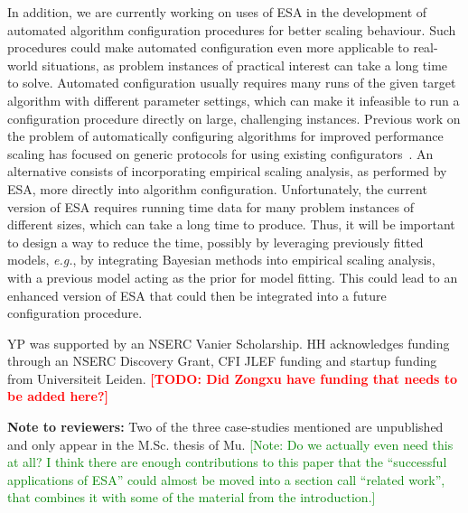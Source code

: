 \documentclass[aic]{iosart2x}
\newcommand{\eg}{\emph{e.g.}}
\newcommand{\todo}[1]{\textcolor{red}{\bf [TODO: #1]}}
\newcommand{\note}[1]{\textcolor{green}{[Note: #1]}}
\begin{document}
In addition, we are currently working on uses of ESA in the development of automated algorithm configuration procedures for better scaling behaviour. Such procedures could make automated configuration even more applicable to real-world situations, as problem instances of practical interest can take a long time to solve. Automated configuration usually requires many runs of the given target algorithm with different parameter settings, which can make it infeasible to run a configuration procedure directly on large, challenging instances.
Previous work on the problem of automatically configuring algorithms for improved performance scaling has focused on generic protocols for using existing configurators~\cite{StyEtAl12,StyHoo13}. 
An alternative consists of incorporating empirical scaling analysis, as performed by ESA, more directly into algorithm configuration. Unfortunately, the current version of ESA requires running time data for many problem instances of different sizes,
which can take a long time to produce. Thus, it will be important to design a way to reduce the time, possibly by leveraging previously fitted models, \eg{}, by integrating Bayesian methods into empirical scaling analysis, with a previous model acting as the prior for model fitting. This could lead to an enhanced version of ESA that could then be integrated into a future configuration procedure.


\begin{acks}
YP was supported by an NSERC Vanier Scholarship. HH acknowledges funding through an NSERC Discovery Grant, CFI JLEF funding and startup funding from Universiteit Leiden. \todo{Did Zongxu have funding that needs to be added here?}
\end{acks}

\bigskip


\noindent
\footnotesize
\textbf{Note to reviewers:} 
Two of the three case-studies mentioned
are unpublished and only appear in the M.Sc. thesis of Mu. \note{Do we actually even need this at all? I think there are enough contributions to this paper that the ``successful applications of ESA'' could almost be moved into a section call ``related work'', that combines it with some of the material from the introduction.}




\end{document}
